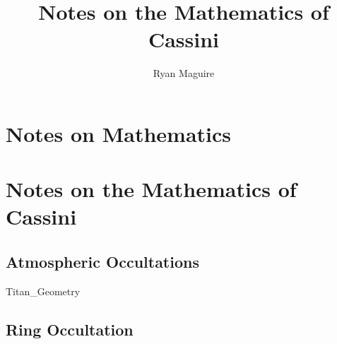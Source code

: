 \documentclass[crop=false,class=book,oneside]{standalone}
\begin{document}
    \newif\ifresearchnotesosthemathematicsofcassini
    \ifx\ifresearch\undefined
        \title{Notes on the Mathematics of Cassini}
        \author{Ryan Maguire}
        \date{\vspace{-5ex}}
        \maketitle
        \tableofcontents
        \chapter*{Notes on Mathematics}
        \setcounter{chapter}{1}
    \else
        \chapter{Notes on the Mathematics of Cassini}
    \fi
    \section{Atmospheric Occultations}
        {Titan_Geometry}
    \section{Ring Occultation}
\end{document}
